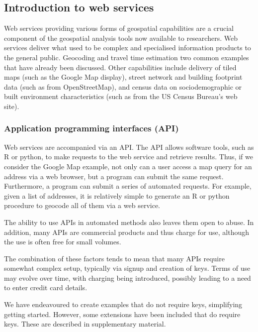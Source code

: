 \documentclass[utf8]{frontiersHLTH}
\begin{document}
\hypertarget{introduction-to-web-services}{%
\subsection{Introduction to web
services}\label{introduction-to-web-services}}

Web services providing various forms of geospatial capabilities are a
crucial component of the geospatial analysis tools now available to
researchers. Web services deliver what used to be complex and
specialised information products to the general public. Geocoding and
travel time estimation two common examples that have already been
discussed. Other capabilities include delivery of tiled maps (such as
the Google Map display), street network and building footprint data
(such as from OpenStreetMap), and census data on sociodemographic or
built environment characteristics (such as from the US Census Bureau's
web site).

\subsubsection{Application programming interfaces
(API)}\label{application-programming-interfaces-api}

Web services are accompanied via an API. The API allows software tools,
such as R or python, to make requests to the web service and retrieve
results. Thus, if we consider the Google Map example, not only can a
user access a map query for an address via a web browser, but a program
can submit the same request. Furthermore, a program can submit a series
of automated requests. For example, given a list of addresses, it is
relatively simple to generate an R or python procedure to geocode all of
them via a web service.

The ability to use APIs in automated methods also leaves them open to
abuse. In addition, many APIs are commercial products and thus charge
for use, although the use is often free for small volumes.

The combination of these factors tends to mean that many APIs require
somewhat complex setup, typically via signup and creation of keys. Terms
of use may evolve over time, with charging being introduced, possibly
leading to a need to enter credit card details.

We have endeavoured to create examples that do not require keys,
simplifying getting started. However, some extensions have been included
that do require keys. These are described in supplementary material.
\end{document}
